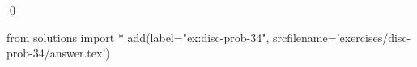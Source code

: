
\begin{ex} 
  \label{ex:disc-prob-34}
  
  \qed
\end{ex} 
\begin{python0}
from solutions import *
add(label="ex:disc-prob-34",
    srcfilename='exercises/disc-prob-34/answer.tex') 
\end{python0}
